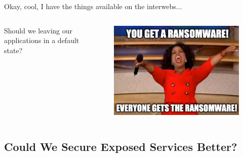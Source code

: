 \documentclass{beamer}
\begin{document}
\begin{frame}
    \begin{center}
        Okay, cool, I have the things available on the interwebs...
    \end{center}
\end{frame}


\begin{frame}
    \begin{columns}
        \begin{column}{0.5\textwidth}
            Should we leaving our applications in a default state?
        \end{column}
        \begin{column}{0.5\textwidth}
            \begin{figure}
                \centering
                \includegraphics[width=\textwidth,keepaspectratio]{../resources/oprah.png}
            \end{figure}
        \end{column}
    \end{columns}
\end{frame}

\subsection{Could We Secure Exposed Services Better?}
\end{document}
